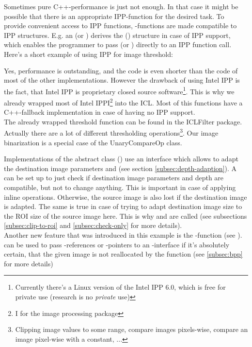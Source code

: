 Sometimes pure C++-performance is just not enough. In that case it might be possible that there is an appropriate IPP-function for the desired task. To provide convenient access to IPP functions, -functions are made compatible to IPP structures. E.g. an  (or ) derives the  () structure in case of IPP support, which enables the programmer to pass  (or ) directly to an IPP function call.\\
Here's a short example of using IPP for image threshold: 


Yes, performance is outstanding, and the code is even shorter than the code of most of the other implementations. However the drawback of using Intel IPP is the fact, that Intel IPP is proprietary closed source software\footnote{Currently there's a Linux version of the Intel IPP 6.0, which is free for private use (research is no \emph{private} use)}. This is why we already wrapped most of Intel IPPI\footnote{I for the image processing package} into the ICL. Most of this functions have a C++-fallback implementation  in case of having no IPP support.\\
The already wrapped threshold function can be found in the ICLFilter  package. Actually there are a lot of different thresholding operations\footnote{Clipping image values to some range, compare images pixels-wise, compare an image pixel-wise with a constant, ...}. Our image binarization is a special case of the UnaryCompareOp  class.

Implementations of the abstract class  () use an  interface which allows to adapt the destination image parameters and  (see section \ref{subsec:depth-adaption}). A  can be set up to just check if destination image parameters and depth are compatible, but not to change anything. This is important in case of applying inline operations. Otherwise, the source image is also lost if the destination image is adapted. The same is true in case of trying to adapt destination image size to the ROI size of the source image here. This is why  and  are called (see subsections \ref{subsec:clip-to-roi} and \ref{subsec:check-only} for more details).\\
Another new feature that was introduced in this example is the -function (see ).  can be used to pass -references or -pointers to an -interface if it's absolutely certain, that the given image is not reallocated by the function (see \ref{subsec:bpp} for more details) 

